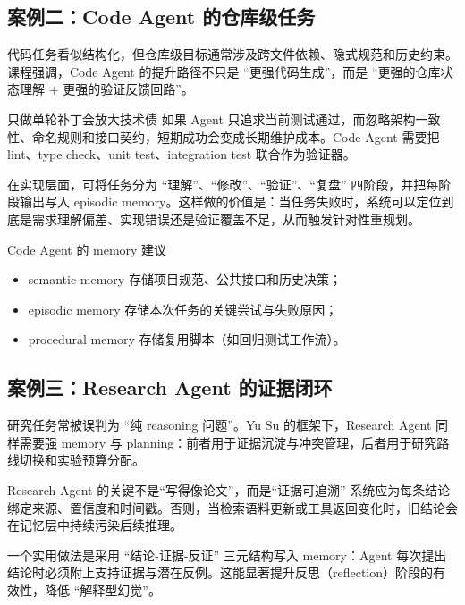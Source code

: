 \documentclass[a4paper]{article}
\begin{document}
\subsection{案例二：Code Agent 的仓库级任务}
代码任务看似结构化，但仓库级目标通常涉及跨文件依赖、隐式规范和历史约束。课程强调，Code Agent 的提升路径不只是 ``更强代码生成''，而是 ``更强的仓库状态理解 + 更强的验证反馈回路''。

\begin{warningbox}{只做单轮补丁会放大技术债}
如果 Agent 只追求当前测试通过，而忽略架构一致性、命名规则和接口契约，短期成功会变成长期维护成本。Code Agent 需要把 lint、type check、unit test、integration test 联合作为验证器。
\end{warningbox}

在实现层面，可将任务分为 ``理解''、``修改''、``验证''、``复盘'' 四阶段，并把每阶段输出写入 episodic memory。这样做的价值是：当任务失败时，系统可以定位到底是需求理解偏差、实现错误还是验证覆盖不足，从而触发针对性重规划。

\begin{knowledgebox}{Code Agent 的 memory 建议}
\begin{itemize}
    \item semantic memory 存储项目规范、公共接口和历史决策；
    \item episodic memory 存储本次任务的关键尝试与失败原因；
    \item procedural memory 存储复用脚本（如回归测试工作流）。
\end{itemize}
\end{knowledgebox}

\subsection{案例三：Research Agent 的证据闭环}
研究任务常被误判为 ``纯 reasoning 问题''。Yu Su 的框架下，Research Agent 同样需要强 memory 与 planning：前者用于证据沉淀与冲突管理，后者用于研究路线切换和实验预算分配。

\begin{importantbox}{Research Agent 的关键不是“写得像论文”，而是“证据可追溯”}
系统应为每条结论绑定来源、置信度和时间戳。否则，当检索语料更新或工具返回变化时，旧结论会在记忆层中持续污染后续推理。
\end{importantbox}

一个实用做法是采用 ``结论-证据-反证'' 三元结构写入 memory：Agent 每次提出结论时必须附上支持证据与潜在反例。这能显著提升反思（reflection）阶段的有效性，降低 ``解释型幻觉''。
\end{document}
